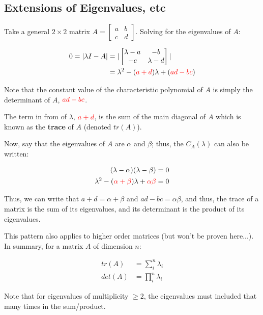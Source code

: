 \documentclass[12pt]{article}
\begin{document}
{{\subsection{Extensions of Eigenvalues, etc}

Take a general $2 \times 2$ matrix $A = \begin{bmatrix}
    a & b\\
    c & d
\end{bmatrix}$. Solving for the eigenvalues of $A$:

\begin{align*}
    0 = |\lambda I - A| &= |\begin{bmatrix}
        \lambda - a & -b\\
        -c & \lambda - d
    \end{bmatrix}|\\
    &= \lambda^2 - (\textcolor{red}{a+d})\lambda + (\textcolor{red}{ad - bc})\\
\end{align*}

Note that the constant value of the characteristic polynomial of $A$ is simply the determinant of $A$, $\textcolor{red}{ad - bc}$.

The term in from of $\lambda$, $\textcolor{red}{a+d}$, is the sum of the main diagonal of $A$ which is known as the \textbf{trace} of $A$ (denoted $tr(A)$). 

Now, say that the eigenvalues of $A$ are $\alpha$ and $\beta$; thus, the $C_A(\lambda)$ can also be written:

\begin{align*}
    (\lambda - \alpha)(\lambda - \beta) &= 0\\
    \lambda^2 - (\textcolor{red}{\alpha + \beta})\lambda + \textcolor{red}{\alpha\beta} &= 0
\end{align*}
    
Thus, we can write that $a+d = \alpha + \beta$ and $ad - bc = \alpha\beta$, and thus, the trace of a matrix is the sum of its eigenvalues, and its determinant is the product of its eigenvalues. 

This pattern also applies to higher order matrices (but won't be proven here...). In summary, for a matrix $A$ of dimension $n$:

\begin{align*}
    tr(A) &= \sum_i^n \lambda_i \\
    det(A) &= \prod_i^n \lambda_i
\end{align*}

Note that for eigenvalues of multiplicity $\geq 2$, the eigenvalues must included that many times in the sum/product.

}}
\end{document}
